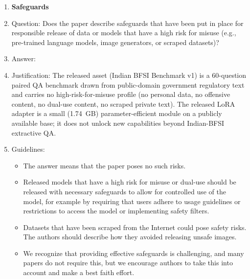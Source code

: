 \begin{enumerate}
\item {\bf Safeguards}
    \item[] Question: Does the paper describe safeguards that have been put in place for responsible release of data or models that have a high risk for misuse (e.g., pre-trained language models, image generators, or scraped datasets)?
    \item[] Answer: \answerNA{}
    \item[] Justification: The released asset (Indian BFSI Benchmark v1) is a 60-question paired QA benchmark drawn from public-domain government regulatory text and carries no high-risk-for-misuse profile (no personal data, no offensive content, no dual-use content, no scraped private text). The released LoRA adapter is a small (1.74~GB) parameter-efficient module on a publicly available base; it does not unlock new capabilities beyond Indian-BFSI extractive QA.
    \item[] Guidelines:
    \begin{itemize}
        \item The answer \answerNA{} means that the paper poses no such risks.
        \item Released models that have a high risk for misuse or dual-use should be released with necessary safeguards to allow for controlled use of the model, for example by requiring that users adhere to usage guidelines or restrictions to access the model or implementing safety filters.
        \item Datasets that have been scraped from the Internet could pose safety risks. The authors should describe how they avoided releasing unsafe images.
        \item We recognize that providing effective safeguards is challenging, and many papers do not require this, but we encourage authors to take this into account and make a best faith effort.
    \end{itemize}


\end{enumerate}
